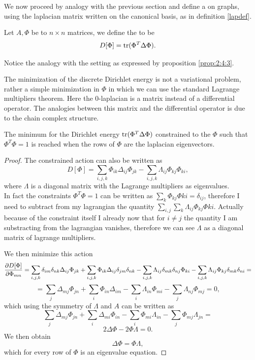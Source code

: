 \documentclass[../2.tex]{subfiles}
\begin{document}
We now proceed by analogy with the previous section and define a  on graphs, using the laplacian matrix written on the canonical basis, as
in definition \ref{lapdef}.

\begin{defn}
    Let $A,\Phi$ be to $n\times n$ matrices, we define the  to be 
    \[ D[\Phi] = \operatorname{tr}(\Phi^T \Delta \Phi). \]
\end{defn}

Notice the analogy with the setting as expressed by proposition \ref{prop:2:4:3}.

The minimization of the discrete Dirichlet energy is not a variational problem, rather a simple minimization in $\Phi$ in which we can 
use the standard Lagrange multipliers theorem. Here the $0$-laplacian is a matrix instead of a differential operator. The analogies between
this matrix and the differential operator is due to the chain complex structure.

\begin{prop}
    The minimum for the Dirichlet energy $ \operatorname{tr}(\Phi^T \Delta \Phi)$ constrained to the $\Phi$ such that $\Phi^T \Phi = 1$ is reached when the
    rows of $\Phi$ are the laplacian eigenvectors.
\end{prop}
\begin{proof}
    The constrained action can also be written as
    \[ D[\Phi] = \sum_{i,j,k} \Phi_{ik} \Delta_{ij} \Phi_{jk} - \sum_{i,j,k} \Lambda_{ij} \Phi_{kj} \Phi_{ki}, \]
    where $\Lambda$ is a diagonal matrix with the Lagrange multipliers as eigenvalues.\\
    {\color{blue}In fact the constraints $\Phi^T \Phi = 1$ can be written as $\sum_k \Phi_{kj} \Phi{ki} = \delta_{ij}$, therefore I need to subtract from my lagrangian
    the quantity $\sum_{i,j} \sum_k \Lambda_{ij} \Phi_{kj} \Phi{ki}$. Actually because of the constraint itself I already now that for $i \neq j$ the quantity
    I am substracting from the lagrangian vanishes, therefore we can see $\Lambda$ as a diagonal matrix of lagrange multipliers. }  

    We then minimize this action 
    \[ \frac{\partial D[\Phi]}{\partial \Phi_{mn}} = \sum_{i,j,k} \delta_{im}\delta_{nk}\Delta_{ij} \Phi_{jk} + \sum_{i,j,k} \Phi_{ik} \Delta_{ij}\delta_{jm}\delta_{nk}
    - \sum_{i,j,k} \Lambda_{ij} \delta_{mk}\delta_{nj}\Phi_{ki} - \sum_{i,j,k} \Lambda_{ij} \Phi_{kj} \delta_{mk}\delta_{ni} =  \]
    \[ = \sum_{j} \Delta_{mj} \Phi_{jn} + \sum_{i} \Phi_{in} \Delta_{im} - \sum_{i} \Lambda_{in} \Phi_{mi} - \sum_{j} \Lambda_{nj} \Phi_{mj} = 0, \]
    which using the symmetry of $\Lambda$ and $A$ can be written as
    \[ \sum_{j} \Delta_{mj} \Phi_{jn} + \sum_{i}  \Delta_{mi} \Phi_{in} - \sum_{i} \Phi_{mi}\Lambda_{in} - \sum_{j} \Phi_{mj} \Lambda_{jn} =  \]
    \[ 2\Delta\Phi - 2\Phi\Lambda = 0. \]
    We then obtain 
    \[ \Delta\Phi = \Phi\Lambda, \]
    which for every row of $\Phi$ is an eigenvalue equation. \qedhere
\end{proof}
\end{document}
